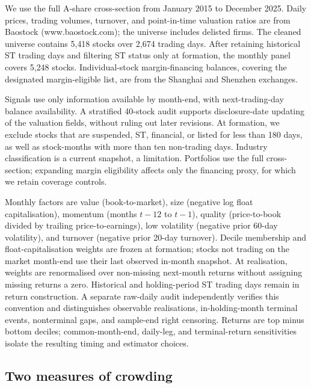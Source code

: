 \documentclass[final,1p,authoryear]{elsarticle}
\begin{document}
\noindent We use the full A-share cross-section from January 2015 to December 2025. Daily prices,
trading volumes, turnover, and point-in-time valuation ratios are from Baostock
(www.baostock.com); the
universe includes delisted firms. The cleaned universe contains 5{,}418 stocks over 2{,}674
trading days. After retaining historical ST trading days and filtering ST status only at
formation, the monthly panel covers 5{,}248 stocks. Individual-stock
margin-financing balances, covering the designated margin-eligible list, are from the Shanghai
and Shenzhen exchanges.

Signals use only information available by month-end, with next-trading-day balance availability.
A stratified 40-stock audit supports disclosure-date updating of the valuation fields, without
ruling out later revisions. At formation, we exclude stocks that are suspended, ST, financial,
or listed for less than 180 days, as well as stock-months with more than ten non-trading days. Industry classification is a current snapshot, a limitation. Portfolios use the full
cross-section; expanding margin eligibility affects only the financing proxy, for which we
retain coverage controls.

Monthly factors are value (book-to-market), size (negative log float capitalisation), momentum
(months $t-12$ to $t-1$), quality (price-to-book divided by trailing price-to-earnings), low
volatility (negative prior 60-day volatility), and turnover (negative prior 20-day turnover).
Decile membership and float-capitalisation weights are frozen at formation; stocks not trading
on the market month-end use their last observed in-month snapshot. At realisation, weights are
renormalised over non-missing next-month returns without assigning missing returns a zero.
Historical and holding-period ST trading days remain in return construction. A separate raw-daily
audit independently verifies this convention and distinguishes observable realisations,
in-holding-month terminal events, nonterminal gaps, and sample-end right censoring.
Returns are top minus bottom deciles; common-month-end, daily-leg, and terminal-return
sensitivities isolate the resulting timing and estimator choices.

\subsection{Two measures of crowding}
\end{document}

